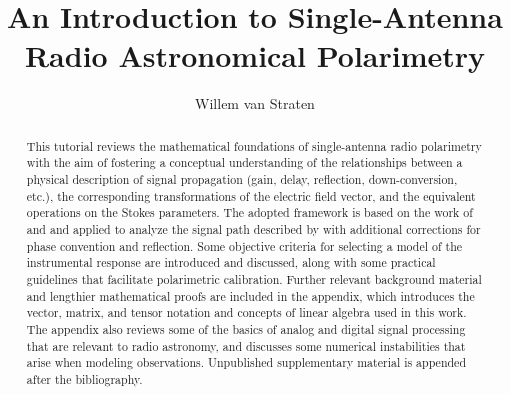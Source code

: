 \documentclass[twocolumn,twocolappendix]{aastex701}
\begin{document}
\title{ An Introduction to Single-Antenna Radio Astronomical Polarimetry }

\author[0000-0003-2519-7375]{Willem van Straten}

\begin{abstract}

%
This tutorial reviews the mathematical foundations of single-antenna 
radio polarimetry with the aim of fostering a conceptual understanding
of the relationships between 
%
a physical description of signal propagation
(gain, delay, reflection, down-conversion, etc.),
the corresponding transformations of the electric field vector, and 
the equivalent operations on the Stokes parameters.  
%
The adopted framework is based on the work of \cite{bri00} and \cite{ham00} and applied to analyze the signal path described by \cite{hbs96} with additional corrections for phase convention and reflection.
%
Some objective criteria for selecting a model of the instrumental response are introduced and discussed, along with some practical guidelines that facilitate polarimetric calibration.
%
Further relevant background material and lengthier mathematical proofs are included in the appendix, which introduces the vector, matrix, and tensor notation and concepts of linear algebra used in this work.  The appendix also reviews some of the basics of analog and digital signal processing that are relevant to radio astronomy, and discusses some numerical instabilities that arise when modeling observations.
%
Unpublished supplementary material is appended after the bibliography.
\end{abstract}


\tableofcontents

\newpage



\setcounter{footnote}{0}

%

%
\end{document}
